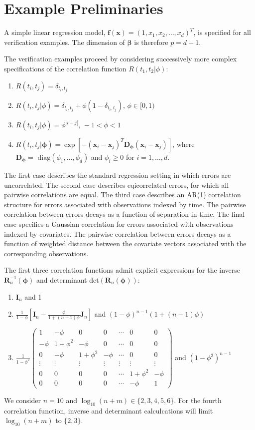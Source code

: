\documentclass[11pt, oneside]{article}   	%
\begin{document}
\section{Example Preliminaries}

A simple linear regression model, $\mathbf{f}(\mathbf{x}) = (1,x_1,x_2,\ldots,x_d)^T$, is specified for all verification examples.  The dimension of $\mathbf{\beta}$ is therefore $p=d+1$.

The verification examples proceed by considering successively more complex specifications of the correlation function $R(t_1, t_2 | \phi)$:
\begin{enumerate}
\item $R(t_i, t_j ) = \delta_{t_i, t_j}$
\item $R(t_i, t_j | \phi) = \delta_{t_i, t_j}+\phi(1-\delta_{t_i,t_j}), \, \phi \in [0,1)$
\item $R(t_i,t_j | \phi) = \phi^{|i-j|}, \, -1 < \phi < 1$
\item $R(t_i,t_j | \mathbf{\phi}) = \exp \left[ -(\mathbf{x}_i - \mathbf{x}_j)^T \mathbf{D}_\mathbf{\phi} (\mathbf{x}_i - \mathbf{x}_j) \right]$, where $\mathbf{D}_\mathbf{\phi} = \mbox{ diag}(\phi_1, \ldots, \phi_d)$ and $\phi_i \ge 0$ for $i=1,\ldots, d$.
\end{enumerate}
The first case describes the standard regression setting in which errors are uncorrelated.  The second case describes eqicorrelated errors, for which all pairwise correlations are equal.  The third case describes an AR(1) correlation structure for errors associated with observations indexed by time.  The pairwise correlation between errors decays as a function of separation in time.  The final case specifies a Gaussian correlation for errors associated with observations indexed by covariates.  The pairwise correlation between errors decays as   a function of weighted distance between the covariate vectors associated with the corresponding observations.

The first three correlation functions admit explicit expressions for the inverse $\mathbf{R}_n^{-1}(\mathbf{\phi})$ and determinant $\mbox{det} \left( \mathbf{R}_n(\mathbf{\phi}) \right)$:
\begin{enumerate}
\item $\mathbf{I}_n$ and 1
\item $ \frac{1}{1-\phi} \left[ \mathbf{I}_n - \frac{\phi}{1+(n-1)\phi} \mathbf{J}_n \right]$ and $(1-\phi)^{n-1}(1+(n-1)\phi)$
\item $\frac{1}{1-\phi^2} \left(
\begin{array}{ccccccc}
1 & -\phi & 0 & 0 & \cdots & 0 & 0\\
-\phi & 1+\phi^2 & -\phi & 0 & \cdots & 0 & 0\\
0 & -\phi & 1+\phi^2 & -\phi & \cdots & 0 & 0\\
\vdots & \vdots & \vdots & \vdots & \vdots & \vdots & \vdots \\
0 & 0 & 0 & 0 & \cdots & 1+\phi^2 & -\phi \\
0 & 0 & 0 & 0 & \cdots & -\phi & 1
\end{array} \right)$ and $(1-\phi^2)^{n-1}$
\end{enumerate}

We consider $n=10$ and $\log_{10}(n+m) \in \{ 2,3,4,5,6 \}$.  For the fourth correlation function, inverse and determinant calculcations will limit $\log_{10}(n+m)$ to $\{ 2,3 \}$.
\end{document}
